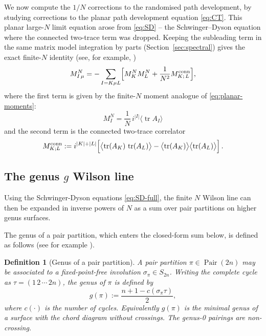 \documentclass[11pt,a4paper]{article}
\newtheorem{definition}[theorem]{Definition}
\DeclareMathOperator{\tr}{tr}
\DeclareMathOperator{\Pair}{Pair}
\begin{document}
We now compute the $1/N$ corrections to the randomised path development, by studying corrections to the planar path development equation \eqref{eq:CT}. This planar large-$N$ limit equation arose from \eqref{eq:SD} -- the Schwinger--Dyson equation where the connected two-trace term was dropped. Keeping the subleading term in the same matrix model integration by parts (Section~\ref{sec:spectral}) gives the exact finite-$N$ identity (see, for example, \cite{migdal1983loop,eynard2016counting,guionnet2007second,guionnet2019asymptotics})
\begin{equation}\label{eq:SD-full}
  M^N_{I\,\mu} = -\sum_{I=K\mu L}\Bigl[M^N_K M^N_L   + \frac{1}{N^2}M^{\mathrm{conn}}_{K;\,L}\Bigr],
\end{equation}
where the first term is given by the finite-$N$ moment analogue of \eqref{eq:planar-moments}:
\begin{equation}
M^N_I = \frac{1}{N}\,i^{|I|}\langle\tr A_I\rangle
\end{equation}
%
and the second term is the connected two-trace correlator
\begin{equation}\label{eq:conn-def}
  M^{\mathrm{conn}}_{K;L} := i^{|K|+|L|}\Bigl[ \bigl\langle\tr(A_K)\,\tr(A_L)\bigr\rangle - \bigl\langle\tr(A_K)\bigr\rangle\bigl\langle\tr(A_L)\bigr\rangle\Bigr]\,.
\end{equation}


\subsection{The genus $g$ Wilson line}\label{sec:general-d}


Using the Schwinger-Dyson equations \eqref{eq:SD-full}, the finite $N$ Wilson line can then be expanded in inverse powers of $N$ as a sum over pair partitions on higher genus surfaces. 

The genus of a pair partition, which enters the closed-form sum below, is defined as follows (see for example \cite{anderson2010introduction, mingo2017free}). 


\begin{definition}[Genus of a pair partition]\label{def:genus-pp}
A pair partition $\pi\in\Pair(2n)$ may be associated to a fixed-point-free involution $\sigma_\pi\in S_{2n}$. Writing the complete cycle as $\tau=(1\,2\,\cdots\,2n)$, the genus of $\pi$ is defined by
\begin{equation}\label{eq:genus-def}
    g(\pi) := \frac{n+1-c(\sigma_\pi\tau)}{2},
\end{equation}
where $c(\cdot)$ is the number of cycles. Equivalently $g(\pi)$ is the minimal genus of a surface with the chord diagram without crossings. The genus-0 pairings are non-crossing.
\end{definition}
\end{document}
